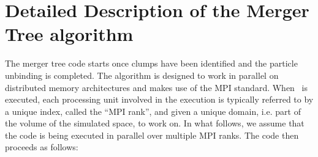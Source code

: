 \section{Detailed Description of the Merger Tree algorithm}\label{app:detailed_mergertree}


The merger tree code starts once clumps have been identified and the particle unbinding is completed.
The algorithm is designed to work in parallel on distributed memory architectures and makes use of the MPI standard.
When \ramses\ is executed, each processing unit involved in the execution is typically referred to by a unique index, 
called the ``MPI rank'', and given a unique domain, i.e. part of the volume of the simulated space, to work on. 
In what follows, we assume that the code is being executed in parallel over multiple MPI ranks.
The code then proceeds as follows:

